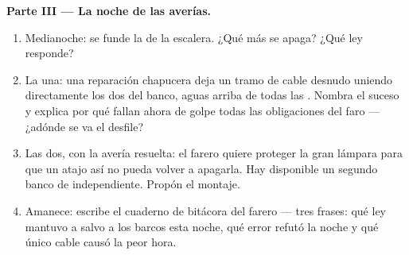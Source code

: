 \begin{problem}
\medskip\noindent\textbf{Parte III --- La noche de las averías.}
\begin{enumerate}[resume]
  \item Medianoche: se funde la  de la escalera. ¿Qué más se
        apaga? ¿Qué ley responde?
  \item La una: una reparación chapucera deja un tramo de cable
        desnudo uniendo directamente los dos  del banco,
        aguas arriba de todas las . Nombra el suceso y
        explica por qué fallan ahora de golpe todas las obligaciones
        del faro --- ¿adónde se va el desfile?
  \item Las dos, con la avería resuelta: el farero quiere proteger la
        gran lámpara para que un atajo así no pueda volver a
        apagarla. Hay disponible un segundo banco de 
        independiente. Propón el montaje.
  \item Amanece: escribe el cuaderno de bitácora del farero --- tres
        frases: qué ley mantuvo a salvo a los barcos esta noche, qué
        error refutó la noche y qué único cable causó la peor hora.
\end{enumerate}
\end{problem}
